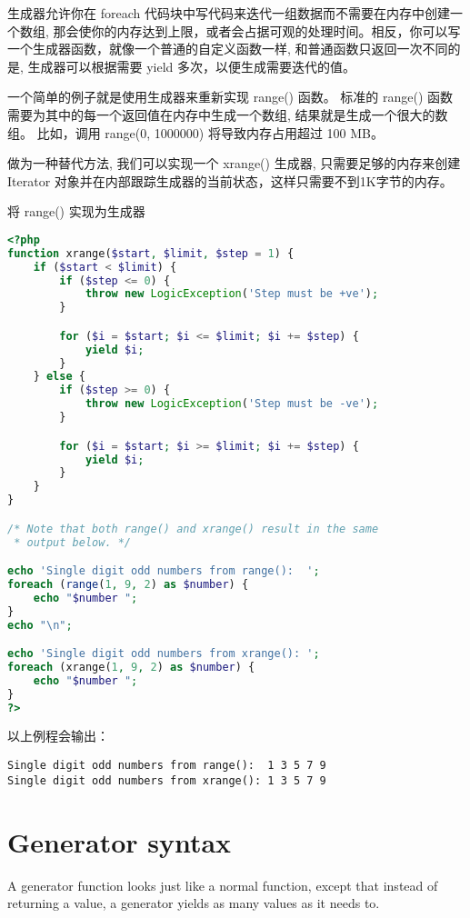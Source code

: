 生成器允许你在 foreach 代码块中写代码来迭代一组数据而不需要在内存中创建一个数组, 那会使你的内存达到上限，或者会占据可观的处理时间。相反，你可以写一个生成器函数，就像一个普通的自定义函数一样, 和普通函数只返回一次不同的是, 生成器可以根据需要 yield 多次，以便生成需要迭代的值。

一个简单的例子就是使用生成器来重新实现 range() 函数。 标准的 range() 函数需要为其中的每一个返回值在内存中生成一个数组, 结果就是生成一个很大的数组。 比如，调用 range(0, 1000000) 将导致内存占用超过 100 MB。

做为一种替代方法, 我们可以实现一个 xrange() 生成器, 只需要足够的内存来创建 Iterator 对象并在内部跟踪生成器的当前状态，这样只需要不到1K字节的内存。

\begin{example}
将 range() 实现为生成器
\begin{lstlisting}[language=PHP]
<?php
function xrange($start, $limit, $step = 1) {
    if ($start < $limit) {
        if ($step <= 0) {
            throw new LogicException('Step must be +ve');
        }

        for ($i = $start; $i <= $limit; $i += $step) {
            yield $i;
        }
    } else {
        if ($step >= 0) {
            throw new LogicException('Step must be -ve');
        }

        for ($i = $start; $i >= $limit; $i += $step) {
            yield $i;
        }
    }
}

/* Note that both range() and xrange() result in the same
 * output below. */

echo 'Single digit odd numbers from range():  ';
foreach (range(1, 9, 2) as $number) {
    echo "$number ";
}
echo "\n";

echo 'Single digit odd numbers from xrange(): ';
foreach (xrange(1, 9, 2) as $number) {
    echo "$number ";
}
?>
\end{lstlisting}
\end{example}

以上例程会输出：

\begin{verbatim}
Single digit odd numbers from range():  1 3 5 7 9 
Single digit odd numbers from xrange(): 1 3 5 7 9 
\end{verbatim}


\section{Generator syntax}

A generator function looks just like a normal function, except that instead of returning a value, a generator yields as many values as it needs to.

